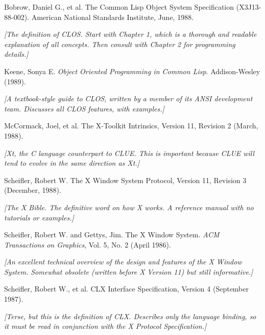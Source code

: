 \begin{thebibliography}{9}

 Bobrow, Daniel G., et al. The Common Lisp Object System
Specification (X3J13-88-002). American National Standards Institute, June,
1988. 

{\em [The definition of CLOS. Start with Chapter 1, which is a thorough and
readable explanation of all concepts. Then consult with Chapter 2 for
programming details.]}

 Keene, Sonya E. {\em Object Oriented Programming in Common
Lisp}. Addison-Wesley (1989).

{\em [A textbook-style guide to CLOS, written by a member of its ANSI
development team. Discusses all CLOS features, with examples.]}

 McCormack, Joel, et al. The X-Toolkit Intrinsics, Version
11, Revision 2 (March, 1988).

{\em [Xt, the C language counterpart to CLUE. This is important because
CLUE will tend to evolve in the same direction as Xt.]}

 Scheifler, Robert W. The X Window System Protocol, Version
11, Revision 3 (December, 1988).

{\em [The X Bible. The definitive word on how X works. A reference manual with
no tutorials or examples.]}

 Scheifler, Robert W. and Gettys, Jim. The X Window
System. {\em ACM Transactions on Graphics}, Vol. 5, No. 2 (April 1986).

{\em [An excellent technical overview of the design and features of the X Window
System. Somewhat obsolete (written before X Version 11) but still informative.]} 

 Scheifler, Robert W., et al. CLX Interface
Specification, Version 4 (September 1987).

{\em [Terse, but this is the definition of CLX. Describes only the language
binding, so it must be read in conjunction with the X Protocol Specification.]}

\end{thebibliography}


\pagebreak
\begin{theindex}

\end{theindex}



